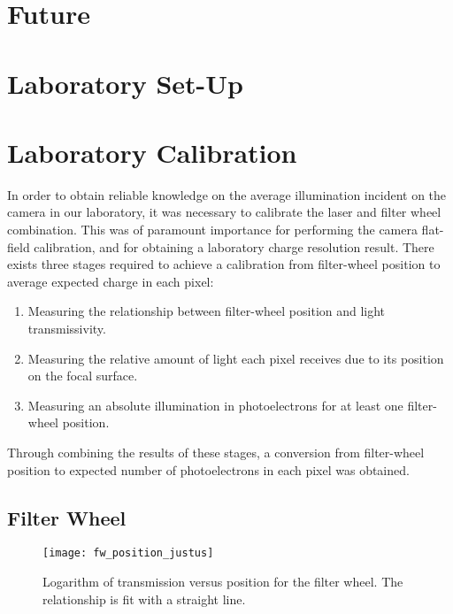 \section{Future}

\section{Laboratory Set-Up}

\section{Laboratory Calibration} \label{section:lab-calib}

In order to obtain reliable knowledge on the average illumination incident on the camera in our laboratory, it was necessary to calibrate the laser and filter wheel combination. This was of paramount importance for performing the camera flat-field calibration, and for obtaining a laboratory charge resolution result. There exists three stages required to achieve a calibration from filter-wheel position to average expected charge in each pixel:
\begin{enumerate}
\item Measuring the relationship between filter-wheel position and light transmissivity.
\item Measuring the relative amount of light each pixel receives due to its position on the focal surface.
\item Measuring an absolute illumination in photoelectrons for at least one filter-wheel position.
\end{enumerate}
Through combining the results of these stages, a conversion from filter-wheel position to expected number of photoelectrons in each pixel was obtained.

\subsection{Filter Wheel}

\begin{figure}
	\centering
    \texttt{[image: fw\_position\_justus]} 
	\caption[Filter-wheel Position Calibration]{Logarithm of transmission versus position for the filter wheel. The relationship is fit with a straight line.}
	\label{fig:fw_position}
\end{figure}

